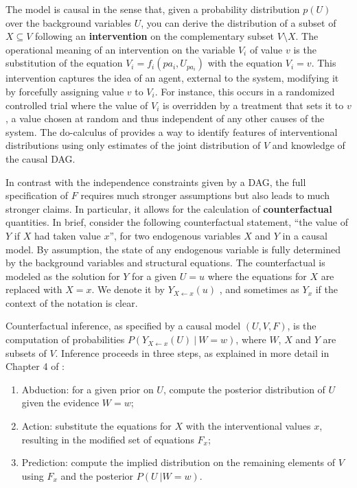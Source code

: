 The model is causal in the sense that, given a  probability distribution
$p(U)$ over the background variables $U$, you can derive the distribution of a
subset of $X\subseteq V$ following an {\bf intervention} on the complementary
subset  $V\setminus X$.  The operational meaning of an intervention on the variable $V_i$ of
value $v$ is the substitution of the equation
$V_i = f_i(pa_i, U_{pa_i})$ with the equation $V_i = v$. This intervention captures
the idea of an agent, external to the system, modifying it by forcefully assigning value $v$ to $V_i$. For
instance, this occurs in a randomized controlled trial where the value of $V_i$ is overridden by a treatment that sets it to $v$, a
value chosen at random and thus independent of any other causes of the
system. The do-calculus of \citet{pearl:00} provides a way to identify
features of interventional distributions %
using only estimates of the joint distribution of $V$ and knowledge of
the causal DAG.

In contrast with the independence constraints given by a DAG, the full
specification of $F$ requires much stronger assumptions but also leads
to much stronger claims. In particular, it allows for the
calculation of {\bf counterfactual} quantities. %
In brief, consider the following counterfactual
statement, ``the value of $Y$ if $X$ had taken value $x$'', for two endogenous
variables $X$ and $Y$ in a causal model. By assumption, the state of
any endogenous variable is fully determined by
the background variables and structural equations. The counterfactual is
modeled as the solution for $Y$ for a given $U = u$ where the equations
for $X$ are replaced with $X = x$.  We denote it by $Y_{X \leftarrow x}(u)$
\cite{pearl:00}, and sometimes as $Y_x$ if the context of the notation is clear.

Counterfactual inference, as specified by a causal model $(U, V, F)$,
is the computation of probabilities
$P(Y_{X \leftarrow x}(U)\ |\ W = w)$, where $W$, $X$ and $Y$ are
subsets of $V$. Inference proceeds in three steps, as explained in
more detail in Chapter 4 of \citet{pearl:16}:
\begin{enumerate}
\item Abduction: for a given prior on $U$, compute the posterior
  distribution of $U$ given the evidence $W = w$;
\item Action: substitute the equations for $X$ with the interventional
  values $x$, resulting in the modified set of equations $F_x$;
\item Prediction: compute the implied distribution on the remaining
  elements of $V$ using $F_x$ and the posterior $P(U\ | W = w)$.
\end{enumerate}



